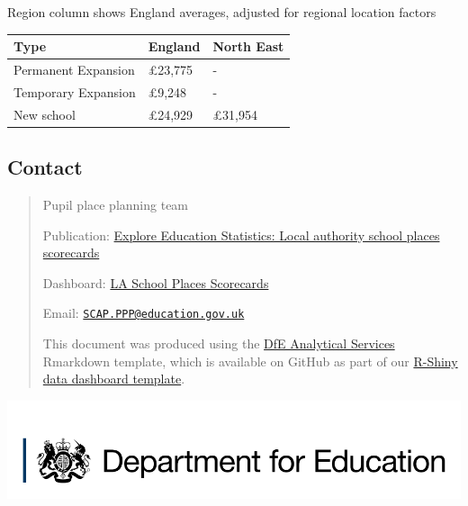 \documentclass[
]{article}
\begin{document}
Region column shows England averages, adjusted for regional location
factors

\begin{tabular}{lll}
\toprule
Type & England & North East\\
\midrule
Permanent Expansion & £23,775 & -\\
Temporary Expansion & £9,248 & -\\
New school & £24,929 & £31,954\\
\bottomrule
\end{tabular}

\newpage
\vspace*{\fill}
\color{dfeheadingblue}{\hrule}
\color{black}

\hypertarget{contact}{%
\subsection{Contact}\label{contact}}

\begin{quote}
Pupil place planning team

Publication:
\href{https://explore-education-statistics.service.gov.uk/find-statistics/local-authority-school-places-scorecards}{Explore
Education Statistics: Local authority school places scorecards}

Dashboard:
\href{https://department-for-education.shinyapps.io/la-school-places-scorecards}{LA
School Places Scorecards}

Email:
\href{mailto:SCAP.PPP@education.gov.uk}{\nolinkurl{SCAP.PPP@education.gov.uk}}

This document was produced using the
\href{https://github.com/dfe-analytical-services}{DfE Analytical
Services} Rmarkdown template, which is available on GitHub as part of
our
\href{https://github.com/dfe-analytical-services/shiny-template}{R-Shiny
data dashboard template}.
\end{quote}

\href{https://www.gov.uk/government/organisations/department-for-education}{\includegraphics[width=0.50\linewidth]{"images/Department_for_Education_long.png"}}
\end{document}
